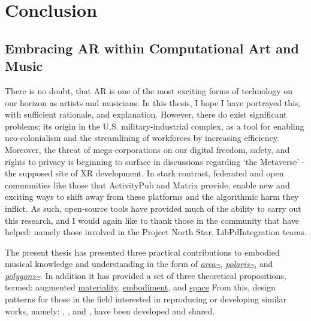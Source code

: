 \chapter{Conclusion}
\label{sec: conclusion}
\epigraph{\emph{}}{}

\section{Embracing AR within Computational Art and Music} \label{sec: conclusion-}
There is no doubt, that AR is one of the most exciting forms of technology on our horizon as artists and musicians. In this thesis, I hope I have portrayed this, with sufficient rationale, and explanation. However, there do exist significant problems; its origin in the U.S. military-industrial complex, as a tool for enabling neo-colonialism and the streamlining of workforces by increasing efficiency. Moreover, the threat of mega-corporations on our digital freedom, safety, and rights to privacy is beginning to surface in discussions regarding `the Metaverse' - the supposed site of XR development. In stark contrast, federated and open communities like those that ActivityPub and Matrix provide, enable new and exciting ways to shift away from these platforms and the algorithmic harm they inflict. As such, open-source tools have provided much of the ability to carry out this research, and I would again like to thank those in the community that have helped: namely those involved in the Project North Star, LibPdIntegration teams.

The present thesis has presented three practical contributions to embodied musical knowledge and understanding in the form of \textit{\hyperref[sec: area]{area\textasciitilde{}}}, \textit{\hyperref[sec: polaris]{polaris\textasciitilde{}}}, and \textit{\hyperref[sec: polygons]{polygons\textasciitilde{}}}. In addition it has provided a set of three theoretical propositions, termed: augmented \hyperref[sec: discussion-medium-material]{materiality}, \hyperref[sec: discussion-medium-embodiment]{embodiment}, and \hyperref[sec: discussion-medium-space]{space} From this, design patterns for those in the field interested in reproducing or developing similar works, namely: \textit{}, \textit{}, and \textit{}, have been developed and shared. 

